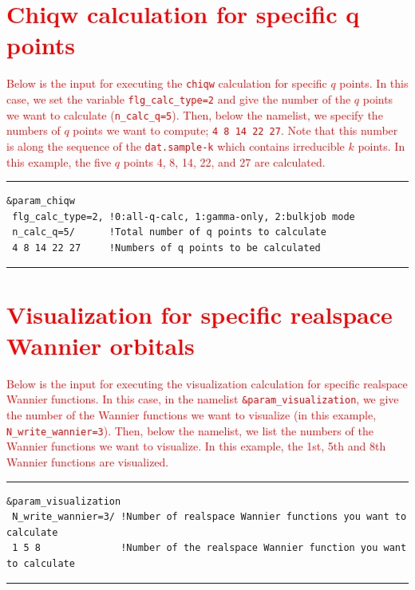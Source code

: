 \documentclass{article}
\newcommand{\tr}[1]{\textcolor{red}{#1}}
\begin{document}
\clearpage

\section{\label{bulkjob}\tr{Chiqw calculation for specific q points}} 

\tr{Below is the input for executing the {\tt chiqw} calculation for specific $q$ points. In this case, we set the variable {\tt flg\_calc\_type=2} and give the number of the $q$ points we want to calculate ({\tt n\_calc\_q=5}). Then, below the namelist, we specify the numbers of $q$ points we want to compute; {\tt 4 8 14 22 27}. Note that this number is along the sequence of the {\tt dat.sample-k} which contains irreducible $k$ points. In this example, the five $q$ points 4, 8, 14, 22, and 27 are calculated.} 
\vspace{3mm}\hrule
\begin{verbatim}
&param_chiqw 
 flg_calc_type=2, !0:all-q-calc, 1:gamma-only, 2:bulkjob mode 
 n_calc_q=5/      !Total number of q points to calculate
 4 8 14 22 27     !Numbers of q points to be calculated
\end{verbatim}
\hrule\vspace{3mm}

\clearpage 

\section{\label{select-wannier}\tr{Visualization for specific realspace Wannier orbitals}} 

\tr{Below is the input for executing the visualization calculation for specific realspace Wannier functions. In this case, in the namelist {\tt \&param\_visualization}, we give the number of the Wannier functions we want to visualize (in this example, {\tt N\_write\_wannier=3}). Then, below the namelist, we list the numbers of the Wannier functions we want to visualize. In this example, the 1st, 5th and 8th Wannier functions are visualized.} 

\vspace{3mm}\hrule
\begin{verbatim}
&param_visualization 
 N_write_wannier=3/ !Number of realspace Wannier functions you want to calculate
 1 5 8              !Number of the realspace Wannier function you want to calculate
\end{verbatim}
\hrule\vspace{3mm}

\clearpage 
\end{document}
